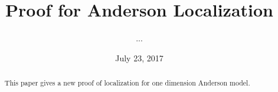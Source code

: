 \title{Proof for Anderson Localization}

\author{...}
\address{Department of Mathematics, University of California, Irvine, Rowland 410C}



\date{July 23, 2017}



\begin{abstract}
  This paper gives a new proof of localization for one dimension Anderson model.
\end{abstract}

\maketitle
